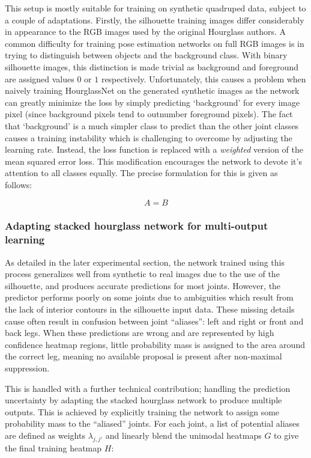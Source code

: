 This setup is mostly suitable for training on synthetic quadruped data, subject to a couple of adaptations. Firstly, the silhouette training images differ considerably in appearance to the RGB images used by the original Hourglass authors. A common difficulty for training pose estimation networks on full RGB images is in trying to distinguish between objects and the background class. With binary silhouette images, this distinction is made trivial as background and foreground are assigned values $0$ or $1$ respectively. Unfortunately, this causes a problem when naively training HourglassNet on the generated synthetic images as the network can greatly minimize the loss by simply predicting `background' for every image pixel (since background pixels tend to outnumber foreground pixels). The fact that `background' is a much simpler class to predict than the other joint classes causes a training instability which is challenging to overcome by adjusting the learning rate. Instead, the loss function is replaced with a \emph{weighted} version of the mean squared error loss. This modification encourages the network to devote it's attention to all classes equally. The precise formulation for this is given as follows:

\begin{equation}\label{weighted-mse}
    A = B
\end{equation}


\subsubsection{Adapting stacked hourglass network for multi-output learning}

As detailed in the later experimental section, the network trained using this process generalizes well from synthetic to real images due to the use of the silhouette, and produces accurate predictions for most joints. However, the predictor performs poorly on some joints due to ambiguities which result from the lack of interior contours in the silhouette input data. These missing details cause often result in confusion between joint ``aliases'': left and right or front and back legs.  When these predictions are wrong and are represented by high confidence heatmap regions, little probability mass is assigned to the area around the correct leg, meaning no available proposal is present after non-maximal suppression.

This is handled with a further technical contribution; handling the prediction uncertainty by adapting the stacked hourglass network to produce multiple outputs. This is achieved by explicitly training the network to assign some probability mass to the ``aliased'' joints. For each joint, a list of potential aliases are defined as weights $\lambda_{j,j'}$ and linearly blend the unimodal heatmaps $G$ to give the final training heatmap $H$:

